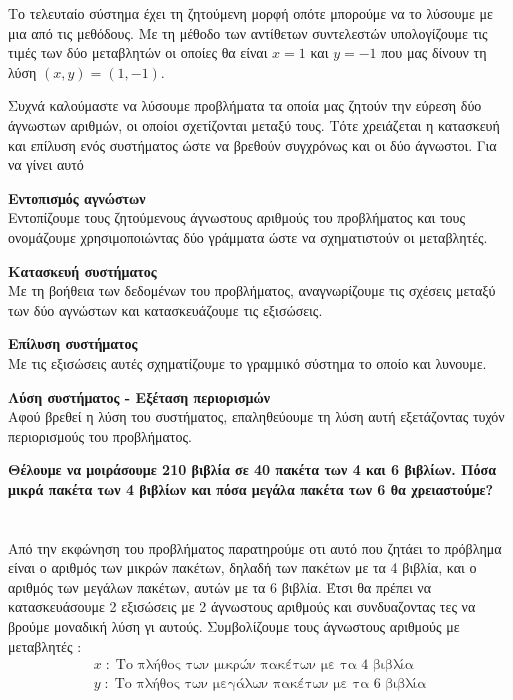 \documentclass[twoside,nofonts,internet,methodoi]{thewria}
\begin{document}
Το τελευταίο σύστημα έχει τη ζητούμενη μορφή οπότε μπορούμε να το λύσουμε με μια από τις μεθόδους. Με τη μέθοδο των αντίθετων συντελεστών υπολογίζουμε τις τιμές των δύο μεταβλητών οι οποίες θα είναι $ x=1 $ και $ y=-1 $ που μας δίνουν τη λύση $ (x,y)=(1,-1) $.
\begin{Methodos}
Συχνά καλούμαστε να λύσουμε προβλήματα τα οποία μας ζητούν την εύρεση δύο άγνωστων αριθμών, οι οποίοι σχετίζονται μεταξύ τους. Τότε χρειάζεται η κατασκευή και επίλυση ενός συστήματος ώστε να βρεθούν συγχρόνως και οι δύο άγνωστοι. Για να γίνει αυτό
\begin{bhma}
\item \textbf{Εντοπισμός αγνώστων}\\
Εντοπίζουμε τους ζητούμενους άγνωστους αριθμούς του προβλήματος και τους ονομάζουμε χρησιμοποιώντας δύο γράμματα ώστε να σχηματιστούν οι μεταβλητές.
\item \textbf{Κατασκευή συστήματος}\\
Με τη βοήθεια των δεδομένων του προβλήματος, αναγνωρίζουμε τις σχέσεις μεταξύ των δύο αγνώστων και κατασκευάζουμε τις εξισώσεις.
\item \textbf{Επίλυση συστήματος}\\
Με τις εξισώσεις αυτές σχηματίζουμε το γραμμικό σύστημα το οποίο και λυνουμε.
\item \textbf{Λύση συστήματος - Εξέταση περιορισμών}\\
Αφού βρεθεί η λύση του συστήματος, επαληθεύουμε τη λύση αυτή εξετάζοντας τυχόν περιορισμούς του προβλήματος.
\end{bhma}
\end{Methodos}
\textbf{Θέλουμε να μοιράσουμε 210 βιβλία σε 40 πακέτα των 4 και 6 βιβλίων. Πόσα μικρά πακέτα των 4 βιβλίων και πόσα μεγάλα πακέτα των 6 θα χρειαστούμε?}\\\\
\lysh\\
Από την εκφώνηση του προβλήματος παρατηρούμε οτι αυτό που ζητάει το πρόβλημα είναι ο αριθμός των μικρών πακέτων, δηλαδή των πακέτων με τα 4 βιβλία, και ο αριθμός των μεγάλων πακέτων, αυτών με τα 6 βιβλία. Έτσι θα πρέπει να κατασκευάσουμε 2 εξισώσεις με 2 άγνωστους αριθμούς και συνδυαζοντας τες να βρούμε μοναδική λύση γι αυτούς.
Συμβολίζουμε τους άγνωστους αριθμούς με μεταβλητές : \begin{gather}
x\;:\;\textrm{Το πλήθος των μικρών πακέτων με τα 4 βιβλία}\\
y\;:\;\textrm{Το πλήθος των μεγάλων πακέτων με τα 6 βιβλία}
\end{gather}
\end{document}
